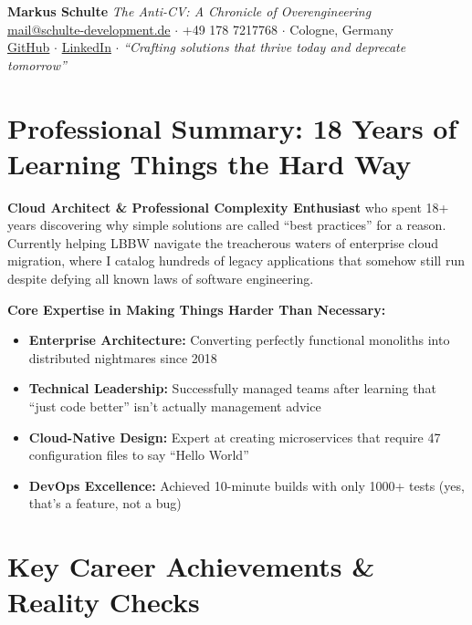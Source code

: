 \documentclass[10pt,a4paper]{article}
\begin{document}
{\LARGE\bfseries\sffamily Markus Schulte} \hfill \textit{The Anti-CV: A Chronicle of Overengineering}\\[2pt]
\href{mailto:mail@schulte-development.de}{mail@schulte-development.de} $\cdot$ 
+49 178 7217768 $\cdot$ Cologne, Germany\\
\href{https://github.com/SchulteDev}{GitHub} $\cdot$ 
\href{https://www.linkedin.com/in/markus-schulte/}{LinkedIn} $\cdot$
\textit{``Crafting solutions that thrive today and deprecate tomorrow''}

\section*{Professional Summary: 18 Years of Learning Things the Hard Way}

\textbf{Cloud Architect \& Professional Complexity Enthusiast} who spent 18+ years discovering why simple solutions are called ``best practices'' for a reason. Currently helping LBBW navigate the treacherous waters of enterprise cloud migration, where I catalog hundreds of legacy applications that somehow still run despite defying all known laws of software engineering.

\textbf{Core Expertise in Making Things Harder Than Necessary:}
\begin{itemize}[topsep=0pt]
\item \textbf{Enterprise Architecture:} Converting perfectly functional monoliths into distributed nightmares since 2018
\item \textbf{Technical Leadership:} Successfully managed teams after learning that ``just code better'' isn't actually management advice
\item \textbf{Cloud-Native Design:} Expert at creating microservices that require 47 configuration files to say ``Hello World''
\item \textbf{DevOps Excellence:} Achieved 10-minute builds with only 1000+ tests (yes, that's a feature, not a bug)
\end{itemize}

\section*{Key Career Achievements \& Reality Checks}
\end{document}
